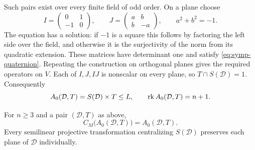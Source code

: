 Such pairs exist over every finite field of odd order.  On a plane
choose
\[
I=\begin{pmatrix}0&1\\-1&0\end{pmatrix},\qquad
J=\begin{pmatrix}a&b\\b&-a\end{pmatrix},
\qquad a^2+b^2=-1.
\]
The equation has a solution: if $-1$ is a square this follows by
factoring the left side over the field, and otherwise it is the
surjectivity of the norm from its quadratic extension.  These matrices
have determinant one and satisfy \eqref{eq:symp-quaternion}.
Repeating the construction on orthogonal planes gives the required
operators on $V$.  Each of $I,J,IJ$ is nonscalar on every plane, so
$T\cap S(\mathcal D)=1$.  Consequently
\begin{equation}\label{eq:symp-seed}
A_0(\mathcal D,T)=S(\mathcal D)\times T\leq L,
\qquad \operatorname{rk} A_0(\mathcal D,T)=n+1.
\end{equation}

\begin{lemma}\label{lem:symp-centralizer}
For $n\geq3$ and a pair $(\mathcal D,T)$ as above,
\[
C_M\bigl(A_0(\mathcal D,T)\bigr)=A_0(\mathcal D,T).
\]
Every semilinear projective transformation centralizing
$S(\mathcal D)$ preserves each plane of $\mathcal D$ individually.
\end{lemma}


